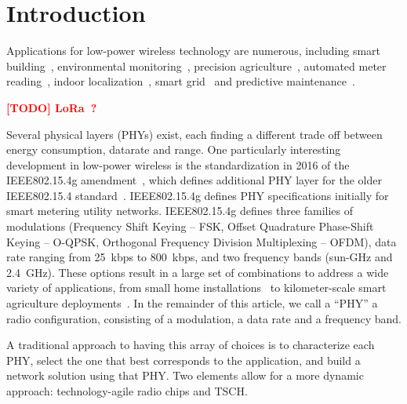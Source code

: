 \documentclass[sensors,article,submit,moreauthors,pdftex]{Definitions/mdpi}
\newcommand{\todo}[1]      {\textbf{\textcolor{red}{[TODO] #1}}}
\begin{document}
\section{Introduction}
\label{sec:introduction}


Applications for low-power wireless technology are numerous, including
    smart building~\cite{munoz18overview,kazmi14review},
    environmental monitoring~\cite{munoz18evaluationa},
    precision agriculture~\cite{watteyne16peach},
    automated meter reading~\cite{sum17experimental},
    indoor localization~\cite{tanaka20blink},
    smart grid~\cite{fadel15survey} and
    predictive maintenance~\cite{civerchia17industrial}.


\todo{LoRa~\cite{adelantado17understanding}?}

Several physical layers (PHYs) exist, each finding a different trade off between
    energy consumption,
    datarate and
    range.
One particularly interesting development in low-power wireless is the standardization in 2016 of the IEEE802.15.4g amendment~\cite{std_ieee802154g}, which defines additional PHY layer for the older IEEE802.15.4 standard~\cite{std_ieee802154}.
IEEE802.15.4g defines PHY specifications initially for smart metering utility networks.
IEEE802.15.4g defines
    three families of modulations (Frequency Shift Keying -- FSK,  Offset Quadrature Phase-Shift Keying -- O-QPSK, Orthogonal Frequency Division Multiplexing -- OFDM),
    data rate ranging from 25~kbps to 800~kbps, and
    two frequency bands (sun-GHz and 2.4~GHz).
These options result in a large set of combinations to address a wide variety of applications, from
    small home installations~\cite{tuset19experimental} to
    kilometer-scale smart agriculture deployments~\cite{munoz19km}.
In the remainder of this article, we call a ``PHY'' a radio configuration, consisting of
    a modulation,
    a data rate and
    a frequency band.


A traditional approach to having this array of choices is to
    characterize each PHY,
    select the one that best corresponds to the application, and
    build a network solution using that PHY.
Two elements allow for a more dynamic approach:
    technology-agile radio chips and
    TSCH.

\end{document}
